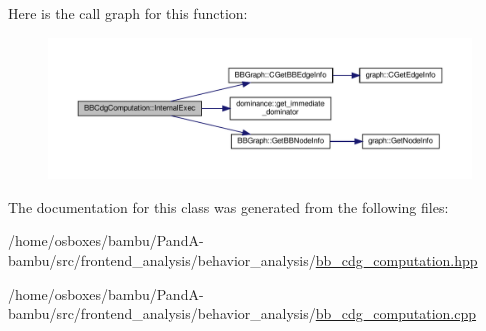 Here is the call graph for this function\+:
\nopagebreak
\begin{figure}[H]
\begin{center}
\leavevmode
\includegraphics[width=350pt]{d5/d7d/classBBCdgComputation_a104af4ec42e6e2057cb89385dd768f02_cgraph}
\end{center}
\end{figure}


The documentation for this class was generated from the following files\+:\begin{DoxyCompactItemize}
\item 
/home/osboxes/bambu/\+Pand\+A-\/bambu/src/frontend\+\_\+analysis/behavior\+\_\+analysis/\hyperlink{bb__cdg__computation_8hpp}{bb\+\_\+cdg\+\_\+computation.\+hpp}\item 
/home/osboxes/bambu/\+Pand\+A-\/bambu/src/frontend\+\_\+analysis/behavior\+\_\+analysis/\hyperlink{bb__cdg__computation_8cpp}{bb\+\_\+cdg\+\_\+computation.\+cpp}\end{DoxyCompactItemize}
